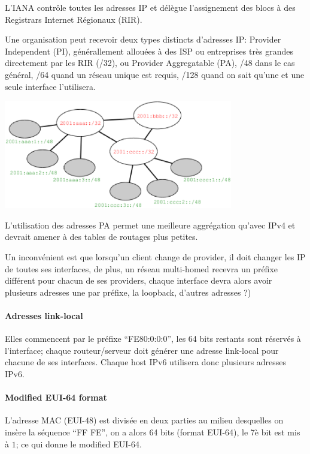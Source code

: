 \documentclass{report}
\begin{document}
L'IANA contrôle toutes les adresses IP et délègue l'assignement des
blocs à des Registrars Internet Régionaux (RIR).

Une organisation peut recevoir deux types distincts d'adresses IP:
Provider Independent (PI), générallement allouées à des ISP ou
entreprises très grandes directement par les RIR (/32), ou Provider
Aggregatable (PA), /48 dans le cas général, /64 quand un réseau unique
est requis, /128 quand on sait qu'une et une seule interface
l'utilisera.

\begin{center}
  \includegraphics[width=0.75\textwidth]{ipv6allocation.eps}
\end{center}

L'utilisation des adresses PA permet une meilleure aggrégation qu'avec
IPv4 et devrait amener à des tables de routages plus petites.

Un inconvénient est que lorsqu'un client change de provider, il doit
changer les IP de toutes ses interfaces, de plus, un réseau
multi-homed recevra un préfixe différent pour chacun de ses providers,
chaque interface devra alors avoir plusieurs adresses une par préfixe,
la loopback, d'autres adresses ?)

\paragraph{Adresses link-local}

Elles commencent par le préfixe ``FE80:0:0:0'', les 64 bits restants
sont réservés à l'interface; chaque routeur/serveur doit générer une
adresse link-local pour chacune de ses interfaces. Chaque host IPv6
utilisera donc plusieurs adresses IPv6.

\paragraph{Modified EUI-64 format}

L'adresse MAC (EUI-48) est divisée en deux parties au milieu
desquelles on insère la séquence ``FF FE'', on a alors 64 bits (format
EUI-64), le 7è bit est mis à $1$; ce qui donne le modified EUI-64.
\end{document}
